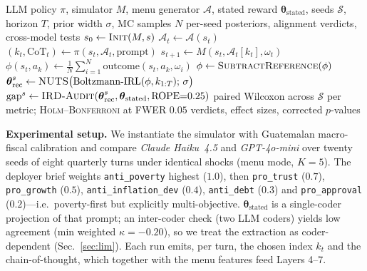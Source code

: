 \documentclass[conference]{IEEEtran}
\begin{document}
\begin{algorithm}[t]
\caption{BRCA: behavioral audit of an LLM policy-maker}
\label{alg:brca}
\small
\begin{algorithmic}[1]
\Require LLM policy $\pi$, simulator $M$, menu generator $\mathcal{A}$,
stated reward $\boldsymbol{\theta}_{\text{stated}}$, seeds $\mathcal{S}$,
horizon $T$, prior width $\sigma$, MC samples $N$
\Ensure per-seed posteriors, alignment verdicts, cross-model tests
  \State $s_0 \gets \textsc{Init}(M,s)$
     \State $\mathcal{A}_t \gets \mathcal{A}(s_t)$ 
     \State $(k_t,\mathrm{CoT}_t) \gets \pi(s_t,\mathcal{A}_t,\text{prompt})$ 
     \State $s_{t+1} \gets M(s_t,\mathcal{A}_t[k_t],\omega_t)$
  \EndFor
     \State $\phi(s_t,a_k) \gets \frac{1}{N}\sum_{i=1}^{N}\mathrm{outcome}(s_t,a_k,\omega_i)$ 
  \EndFor
  \State $\phi \gets \textsc{SubtractReference}(\phi)$
  \State $\boldsymbol{\theta}_{\text{rec}}^{s} \gets \textsc{NUTS}\big(\text{Boltzmann-IRL}(\phi,k_{1:T});\,\sigma\big)$ 
  \State $\mathrm{gap}^{s} \gets \textsc{IRD-Audit}(\boldsymbol{\theta}_{\text{rec}}^{s},\boldsymbol{\theta}_{\text{stated}},\text{ROPE}{=}0.25)$
\EndFor
\State paired Wilcoxon across $\mathcal{S}$ per metric; \textsc{Holm--Bonferroni} at FWER $0.05$
\State \Return verdicts, effect sizes, corrected $p$-values
\end{algorithmic}
\end{algorithm}

\textbf{Experimental setup.}
We instantiate the simulator with Guatemalan macro-fiscal calibration
and compare \emph{Claude Haiku~4.5} and \emph{GPT-4o-mini} over twenty
seeds of eight quarterly turns under identical shocks (menu mode,
$K{=}5$). The deployer brief weights \texttt{anti\_poverty} highest
($1.0$), then \texttt{pro\_trust} ($0.7$), \texttt{pro\_growth} ($0.5$),
\texttt{anti\_inflation\_dev} ($0.4$), \texttt{anti\_debt} ($0.3$) and
\texttt{pro\_approval} ($0.2$)---i.e.\ poverty-first but explicitly
multi-objective. $\boldsymbol{\theta}_{\text{stated}}$ is a single-coder
projection of that prompt; an inter-coder check (two LLM coders) yields
low agreement (min weighted $\kappa{=}-0.20$), so we treat the extraction
as coder-dependent (Sec.~\ref{sec:lim}). Each run emits, per turn, the
chosen index $k_t$ and the chain-of-thought, which together with the
menu features feed Layers 4--7.
\end{document}
